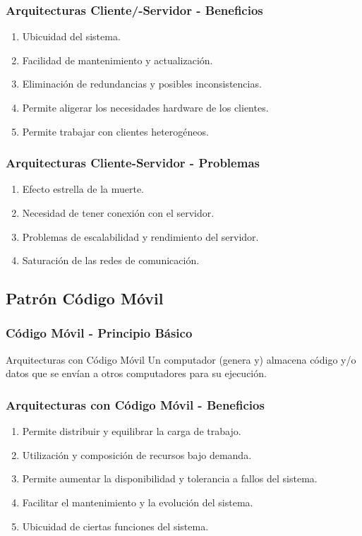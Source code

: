 \documentclass[handout,a4paper,t,xcolor=pst,dvips,colortheme]{beamer}
\begin{document}
\begin{frame}[c]
    \frametitle{Arquitecturas Cliente/-Servidor - Beneficios}
    \begin{enumerate}[<+->]
        \item Ubicuidad del sistema.
        \item Facilidad de mantenimiento y actualización.
        \item Eliminación de redundancias y posibles inconsistencias.
        \item Permite aligerar los necesidades hardware de los clientes.
        \item Permite trabajar con clientes heterogéneos.
    \end{enumerate}
\end{frame}

\begin{frame}[c]
    \frametitle{Arquitecturas Cliente-Servidor - Problemas}
    \begin{enumerate}[<+->]
        \item Efecto estrella de la muerte.
        \item Necesidad de tener conexión con el servidor.
        \item Problemas de escalabilidad y rendimiento del servidor.
        \item Saturación de las redes de comunicación.
    \end{enumerate}
\end{frame}

\subsection{Patrón Código Móvil}

\begin{frame}[c]
    \frametitle{Código Móvil - Principio Básico}
    \begin{block}{Arquitecturas con Código Móvil}
        Un computador (genera y) almacena código y/o datos que se envían a otros computadores para su ejecución.
    \end{block}
\end{frame}

\begin{frame}[c]
    \frametitle{Arquitecturas con Código Móvil - Beneficios}
    \begin{enumerate}[<+->]
        \item Permite distribuir y equilibrar la carga de trabajo.
        \item Utilización y composición de recursos bajo demanda.
        \item Permite aumentar la disponibilidad y tolerancia a fallos del sistema.
        \item Facilitar el mantenimiento y la evolución del sistema.
        \item Ubicuidad de ciertas funciones del sistema.
    \end{enumerate}
\end{frame}
\end{document}
